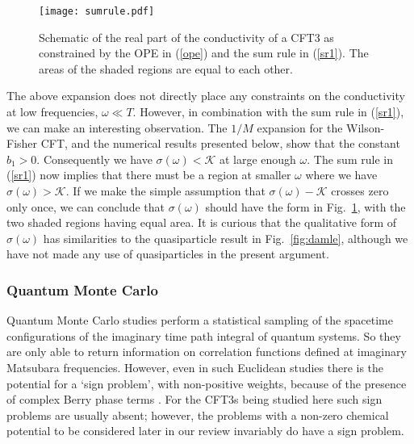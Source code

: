 \documentclass[10pt, oneside]{book}
\begin{document}
\begin{doublespace}
\begin{figure}
\centering
\texttt{[image: sumrule.pdf]}
\caption{\label{fig:sumrule} Schematic of the real part of the conductivity of a CFT3 as constrained by the OPE in (\ref{ope}) 
and the sum rule in (\ref{sr1}). The areas of the shaded regions are equal to each other.}
\end{figure}
The above expansion does not directly place any constraints on the conductivity at low frequencies, $\omega \ll T$. 
However, in combination with the sum rule in (\ref{sr1}), we can make an interesting observation. 
The $1/M$ expansion for the Wilson-Fisher CFT, and the numerical results presented below, show that the constant $b_1 > 0$.
Consequently we have $\sigma (\omega) < \mathcal{K}$ at large enough $\omega$. The sum rule in (\ref{sr1}) now implies
that there must be a region at smaller $\omega$ where we have $\sigma (\omega) > \mathcal{K}$. If we make the simple
assumption that $\sigma (\omega ) - \mathcal{K}$ crosses zero only once, we can conclude that $\sigma (\omega)$ should have the form in 
Fig.~\ref{fig:sumrule}, with the two shaded regions having equal area. It is curious that the qualitative form of $\sigma (\omega)$ has similarities
to the quasiparticle result in Fig.~\ref{fig:damle}, although we have not made any use of quasiparticles in the present argument. 

\subsubsection{Quantum Monte Carlo}

Quantum Monte Carlo studies perform a statistical sampling of the spacetime configurations of the imaginary time path integral
of quantum systems. So they are only able to return information on correlation functions defined at imaginary Matsubara frequencies.
However, even in such Euclidean studies there is the potential for a `sign problem', with non-positive weights, because of the presence of 
complex Berry phase terms \cite{ssbook}. 
For the CFT3s being studied here such sign problems are usually absent; however, the problems with a non-zero
chemical potential to be considered later in our review invariably do have a sign problem.


\end{doublespace}
\end{document}
